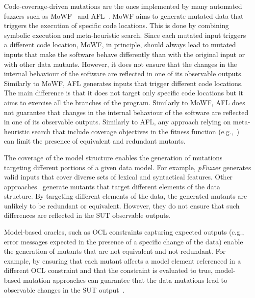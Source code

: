 Code-coverage-driven mutations are the ones implemented by many automated fuzzers such as 
MoWF~\cite{pham2016model} and AFL~\cite{gutmann2016fuzzing}.
MoWF aims to generate mutated data that triggers the execution of specific code locations. This is done by combining symbolic execution and meta-heuristic search.
Since each mutated input triggers a different code location, MoWF, in principle, should always lead to mutated inputs that make the software behave differently than with the original input or with other data mutants. However, it does not ensure that the changes in the internal behaviour of the software are reflected in one of its observable outputs.
Similarly to MoWF, AFL generates inputs that trigger different code locations. The main difference is that it does not target only specific code locations but it aims to exercise all the branches of the program. 
Similarly to MoWF, AFL does not guarantee that changes in the internal behaviour of the software are reflected in one of its observable outputs.
Similarly to AFL, any approach relying on meta-heuristic search that include coverage objectives in the fitness function (e.g.,~\cite{di2015evolutionary}) can limit the presence of equivalent and redundant mutants.


The coverage of the model structure enables the generation of mutations targeting different portions of a given data model.
For example, \emph{pFuzzer} generates valid inputs that cover diverse sets of lexical and syntactical features.
Other approaches~\cite{di2015generating} generate mutants that target different elements of the data structure.
By targeting different elements of the data, the generated mutants are unlikely to be redundant or equivalent. However, they do not ensure that such differences are reflected in the SUT observable outputs.


Model-based oracles, such as OCL constraints capturing expected outputs (e.g., error messages expected in the presence of a specific change of the data) enable the generation of mutants that are not equivalent and not redundant. For example, by ensuring that each mutant affects a model element referenced in a different OCL constraint and that the constraint is evaluated to true, model-based mutation approaches can guarantee that the data mutations lead to observable changes in the SUT output~\cite{di2015generating}.


